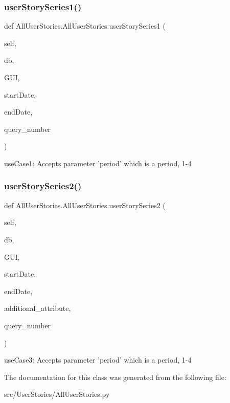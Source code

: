 \subsubsection{\texorpdfstring{user\+Story\+Series1()}{userStorySeries1()}}
{\footnotesize\ttfamily def All\+User\+Stories.\+All\+User\+Stories.\+user\+Story\+Series1 (\begin{DoxyParamCaption}\item[{}]{self,  }\item[{}]{db,  }\item[{}]{G\+UI,  }\item[{}]{start\+Date,  }\item[{}]{end\+Date,  }\item[{}]{query\+\_\+number }\end{DoxyParamCaption})}

\begin{DoxyVerb}useCase1: Accepts parameter 'period' which is a period, 1-4 \end{DoxyVerb}
 \hypertarget{class_all_user_stories_1_1_all_user_stories_a3652c394b2fcdead6261d92c22109f53}{}\label{class_all_user_stories_1_1_all_user_stories_a3652c394b2fcdead6261d92c22109f53} 
\subsubsection{\texorpdfstring{user\+Story\+Series2()}{userStorySeries2()}}
{\footnotesize\ttfamily def All\+User\+Stories.\+All\+User\+Stories.\+user\+Story\+Series2 (\begin{DoxyParamCaption}\item[{}]{self,  }\item[{}]{db,  }\item[{}]{G\+UI,  }\item[{}]{start\+Date,  }\item[{}]{end\+Date,  }\item[{}]{additional\+\_\+attribute,  }\item[{}]{query\+\_\+number }\end{DoxyParamCaption})}

\begin{DoxyVerb}useCase3: Accepts parameter 'period' which is a period, 1-4 \end{DoxyVerb}
 

The documentation for this class was generated from the following file\+:\begin{DoxyCompactItemize}
\item 
src/\+User\+Stories/All\+User\+Stories.\+py\end{DoxyCompactItemize}
